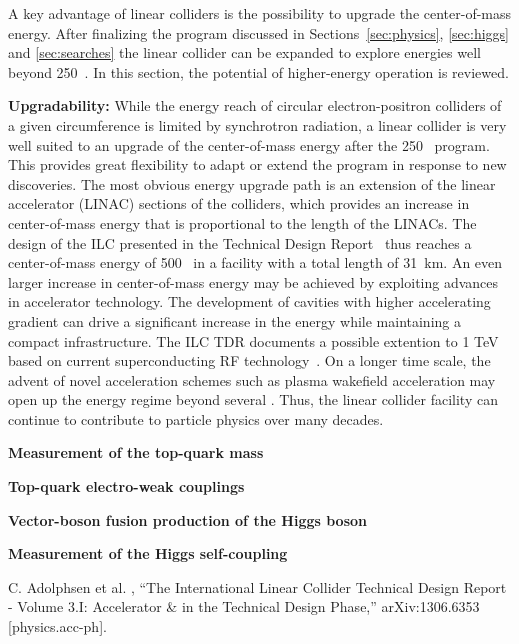 A key advantage of linear colliders is the possibility to upgrade the center-of-mass energy.
After finalizing the program discussed in Sections~\ref{sec:physics}, \ref{sec:higgs} and \ref{sec:searches} the linear collider can be expanded to explore energies well beyond 250~\gev{}. In this section, the potential of higher-energy operation is reviewed.

{\bf Upgradability:} While the energy reach of circular electron-positron colliders of a given circumference is limited by synchrotron radiation, a linear collider is very well suited to an upgrade of the center-of-mass energy after the 250~\gev{} program. This provides great flexibility to adapt or extend the program in response to new discoveries. The most obvious energy upgrade path is an extension of the linear accelerator (LINAC) sections of the colliders, which provides an increase in center-of-mass energy that is proportional to the length of the LINACs. The design of the ILC presented in the Technical Design Report~\cite{} thus reaches a center-of-mass energy of 500~\gev{} in a facility with a total length of 31~km. An even larger increase in center-of-mass energy may be achieved by exploiting advances in accelerator technology. The development of cavities with higher accelerating gradient can drive a significant increase in the energy while maintaining a compact infrastructure. The ILC TDR documents a possible extention to 1 TeV based on current superconducting RF technology~\cite{}. On a longer time scale, the advent of novel acceleration schemes such as plasma wakefield acceleration may open up the energy regime beyond several \tev. Thus, the linear collider facility can continue to contribute to particle physics over many decades. 



{\bf Measurement of the top-quark mass}

{\bf Top-quark electro-weak couplings}

{\bf Vector-boson fusion production of the Higgs boson}

{\bf Measurement of the Higgs self-coupling}


C. Adolphsen
et al.
, “The International Linear Collider Technical Design Report
-  Volume  3.I:  Accelerator  &  in  the  Technical  Design  Phase,”  arXiv:1306.6353
[physics.acc-ph].
